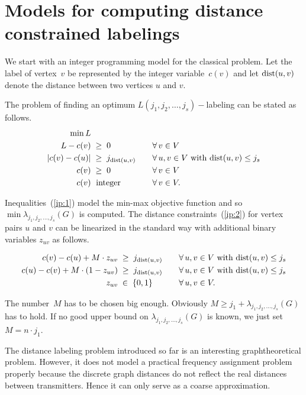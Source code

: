 \documentclass[smallextended]{svjour3}
\def\dist{\mathop{\rm dist}}
\begin{document}
\section{Models for computing distance constrained labelings} 
\label{sec:IP} 

We start with an integer programming model for the classical problem. 
Let the label of vertex~$v$ be represented by the integer 
variable~$c(v)$ and let $\dist(u,v)$ denote the distance between two vertices $u$ and $v$. 

The problem of finding an optimum $L(j_1,j_2,\ldots ,j_{s})-$labeling 
can be stated as follows. 
\begin{alignat}{2} 
\min L      &                            & \quad & \notag\\ 
L-c(v)       &\;\ge\;0                    & \quad &\forall\, v\in V\label{ip:1}\\ 
|c(v)-c(u)| &\;\geq\;j_{\dist(u,v)} & & \forall\, u,v\in V\text{ with }{\dist(u,v)}\le j_s \label{ip:2}\\ 
c(v)          &\;\geq\;0                  & &\forall\, v\in V \label{ip:3}\\ 
c(v)          &\;\text{ integer}       & & \forall\, v\in V.\label{ip:4} 
\end{alignat} 

Inequalities~(\ref{ip:1}) model the min-max objective function and so 
$\min\lambda_{j_1,j_2,\ldots ,j_{s}}(G)$ is computed. The distance 
constraints~(\ref{ip:2}) for vertex pairs $u$ and $v$ can be linearized 
in the standard way with additional binary variables $z_{uv}$ as follows.

\begin{alignat}{2} 
c(v)-c(u)+M\cdot z_{uv}     &\;\geq\;j_{\dist(u,v)} & \quad& \forall\, u,v\in V\text{ with }{\dist(u,v)}\le j_s\notag\\ 
c(u)-c(v)+M\cdot(1-z_{uv}) &\;\geq\;j_{\dist(u,v)} &   &\forall\, u,v\in V\text{ with }{\dist(u,v)}\le j_s\notag\\ 
z_{uv}                                &\;\in\;\{0,1\}              &  & \forall\, u,v\in V.\notag 
\end{alignat} 

The number~$M$ has to be chosen big enough. Obviously 
$M\geq j_1+\lambda_{j_1,j_2,\ldots ,j_{s}}(G)$ has to hold. If no good upper bound 
on $\lambda_{j_1,j_2,\ldots ,j_{s}}(G)$ is known, we just set $M=n\cdot j_1$. 

The distance labeling problem introduced so far is an interesting 
graphtheoretical problem. However, it does not model a practical frequency 
assignment problem properly because the discrete graph distances do not 
reflect the real distances between transmitters. Hence it can only serve 
as a coarse approximation. 
\end{document}
